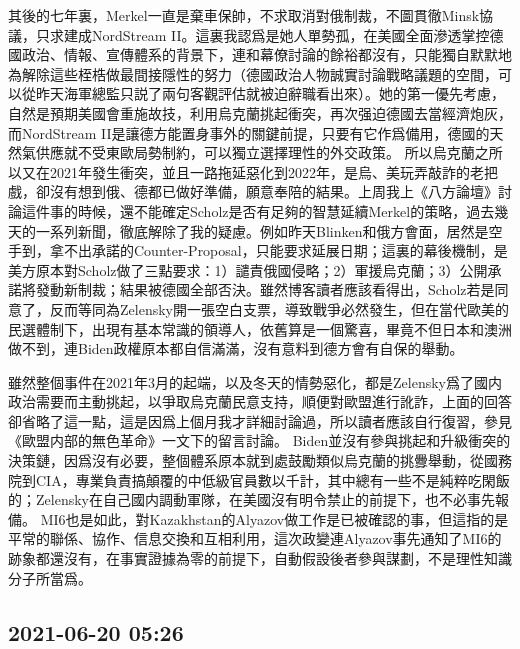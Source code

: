 \documentclass[twocolumn]{ctexart}
\begin{document}
其後的七年裏，Merkel一直是棄車保帥，不求取消對俄制裁，不圖貫徹Minsk協議，只求建成NordStream II。這裏我認爲是她人單勢孤，在美國全面滲透掌控德國政治、情報、宣傳體系的背景下，連和幕僚討論的餘裕都沒有，只能獨自默默地為解除這些桎梏做最間接隱性的努力（德國政治人物誠實討論戰略議題的空間，可以從昨天海軍總監只説了兩句客觀評估就被迫辭職看出來）。她的第一優先考慮，自然是預期美國會重施故技，利用烏克蘭挑起衝突，再次强迫德國去當經濟炮灰，而NordStream II是讓德方能置身事外的關鍵前提，只要有它作爲備用，德國的天然氣供應就不受東歐局勢制約，可以獨立選擇理性的外交政策。
所以烏克蘭之所以又在2021年發生衝突，並且一路拖延惡化到2022年，是烏、美玩弄敲詐的老把戲，卻沒有想到俄、德都已做好準備，願意奉陪的結果。上周我上《八方論壇》討論這件事的時候，還不能確定Scholz是否有足夠的智慧延續Merkel的策略，過去幾天的一系列新聞，徹底解除了我的疑慮。例如昨天Blinken和俄方會面，居然是空手到，拿不出承諾的Counter-Proposal，只能要求延展日期；這裏的幕後機制，是美方原本對Scholz做了三點要求：1）譴責俄國侵略；2）軍援烏克蘭；3）公開承諾將發動新制裁；結果被德國全部否決。雖然博客讀者應該看得出，Scholz若是同意了，反而等同為Zelensky開一張空白支票，導致戰爭必然發生，但在當代歐美的民選體制下，出現有基本常識的領導人，依舊算是一個驚喜，畢竟不但日本和澳洲做不到，連Biden政權原本都自信滿滿，沒有意料到德方會有自保的舉動。

雖然整個事件在2021年3月的起端，以及冬天的情勢惡化，都是Zelensky爲了國内政治需要而主動挑起，以爭取烏克蘭民意支持，順便對歐盟進行訛詐，上面的回答卻省略了這一點，這是因爲上個月我才詳細討論過，所以讀者應該自行復習，參見《歐盟内部的無色革命》一文下的留言討論。
Biden並沒有參與挑起和升級衝突的決策鏈，因爲沒有必要，整個體系原本就到處鼓勵類似烏克蘭的挑釁舉動，從國務院到CIA，專業負責搞顛覆的中低級官員數以千計，其中總有一些不是純粹吃閑飯的；Zelensky在自己國内調動軍隊，在美國沒有明令禁止的前提下，也不必事先報備。
MI6也是如此，對Kazakhstan的Alyazov做工作是已被確認的事，但這指的是平常的聯係、協作、信息交換和互相利用，這次政變連Alyazov事先通知了MI6的跡象都還沒有，在事實證據為零的前提下，自動假設後者參與謀劃，不是理性知識分子所當爲。
\subsection*{2021-06-20 05:26}
\end{document}
